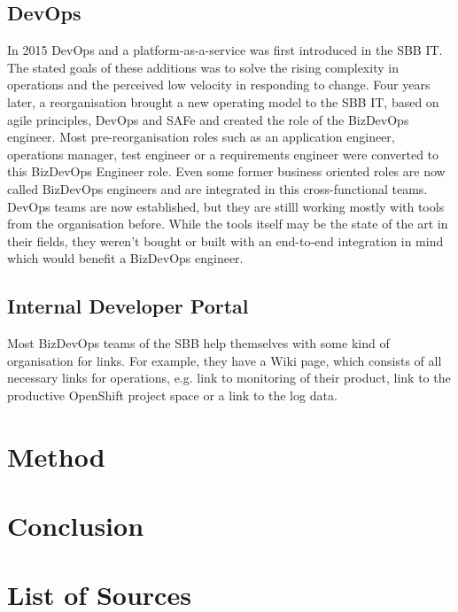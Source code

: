 \documentclass[a4paper,12pt]{article}
\begin{document}
    \subsection{DevOps}
    In 2015 DevOps and a platform-as-a-service was first introduced in the SBB IT.
    The stated goals of these additions was to solve the rising complexity in operations and the perceived low velocity
    in responding to change\parencite{sbbdevops}.
    Four years later, a reorganisation brought a new operating model to the SBB IT, based on agile principles, DevOps and SAFe
    and created the role of the BizDevOps engineer\parencite{sbbagile}.
    Most pre-reorganisation roles such as an application engineer, operations manager, test engineer or a requirements engineer
    were converted to this BizDevOps Engineer role.
    Even some former business oriented roles are now called BizDevOps engineers and are integrated in this cross-functional
    teams.
    DevOps teams are now established, but they are stilll working mostly with tools from the organisation before.
    While the tools itself may be the state of the art in their fields, they weren't bought or built with an end-to-end
    integration in mind which would benefit a BizDevOps engineer.

    \subsection{Internal Developer Portal}
    Most BizDevOps teams of the SBB help themselves with some kind of organisation for links.
    For example, they have a Wiki page, which consists of all necessary links for operations, e.g. link to monitoring
    of their product,    link to the productive OpenShift project space or a link to the log data.


    \section{Method}


    \section{Conclusion}
    \pagebreak


    \section{List of Sources}

    \printbibliography[heading=none]
\end{document}
